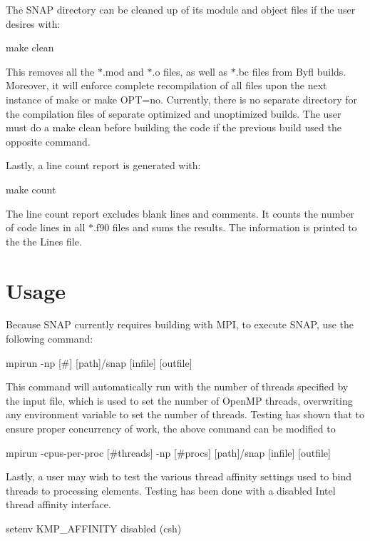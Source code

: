 The S\-N\-A\-P directory can be cleaned up of its module and object files if the user desires with\-: \begin{DoxyVerb}make clean
\end{DoxyVerb}


This removes all the {\ttfamily $\ast$.mod} and {\ttfamily $\ast$.o} files, as well as {\ttfamily $\ast$.bc} files from Byfl builds. Moreover, it will enforce complete recompilation of all files upon the next instance of {\ttfamily make} or {\ttfamily make O\-P\-T=no}. Currently, there is no separate directory for the compilation files of separate optimized and unoptimized builds. The user must do a {\ttfamily make clean} before building the code if the previous build used the opposite command.

Lastly, a line count report is generated with\-: \begin{DoxyVerb}make count
\end{DoxyVerb}


The line count report excludes blank lines and comments. It counts the number of code lines in all {\ttfamily $\ast$.f90} files and sums the results. The information is printed to the the {\ttfamily Lines} file.

\section*{Usage}

Because S\-N\-A\-P currently requires building with M\-P\-I, to execute S\-N\-A\-P, use the following command\-: \begin{DoxyVerb}mpirun -np [#] [path]/snap [infile] [outfile]
\end{DoxyVerb}


This command will automatically run with the number of threads specified by the input file, which is used to set the number of Open\-M\-P threads, overwriting any environment variable to set the number of threads. Testing has shown that to ensure proper concurrency of work, the above command can be modified to \begin{DoxyVerb}mpirun -cpus-per-proc [#threads] -np [#procs] [path]/snap [infile] [outfile]
\end{DoxyVerb}


Lastly, a user may wish to test the various thread affinity settings used to bind threads to processing elements. Testing has been done with a disabled Intel thread affinity interface. \begin{DoxyVerb}setenv KMP_AFFINITY disabled (csh)
\end{DoxyVerb}


